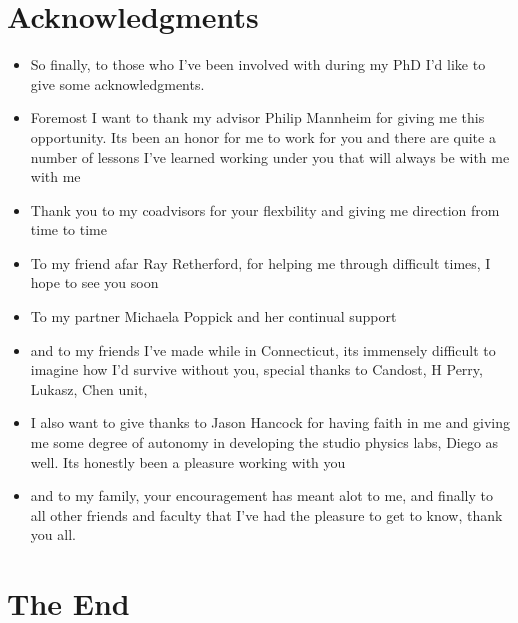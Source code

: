 \documentclass[10pt,letterpaper]{article}
\numberwithin{equation}{section}
\begin{document}

\section{Acknowledgments}
\begin{itemize}
	\item So finally, to those who I've been involved with during my PhD I'd like to give some acknowledgments.
	\item Foremost I want to thank my advisor Philip Mannheim for giving me this opportunity. Its been an honor for me to work for you and there are quite a number of lessons I've learned working under you that will always be with me with me
	\item Thank you to my coadvisors for your flexbility and giving me direction from time to time
	\item To my friend afar Ray Retherford, for helping me through difficult times, I hope to see you soon
	\item To my partner Michaela Poppick and her continual support
	\item and to my friends I've made while in Connecticut, its immensely difficult to imagine how I'd survive without you, special thanks to Candost, H Perry, Lukasz, Chen unit,
	\item I also want to give thanks to Jason Hancock for having faith in me and giving me some degree of autonomy in developing the studio physics labs, Diego as well. Its honestly been a pleasure working with you
	\item and to my family, your encouragement has meant alot to me, and finally to all other friends and faculty that I've had the pleasure to get to know, thank you all. 
\end{itemize}


\section{The End}

\end{document}
